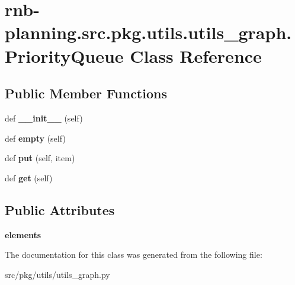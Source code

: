 \hypertarget{classrnb-planning_1_1src_1_1pkg_1_1utils_1_1utils__graph_1_1_priority_queue}{}\section{rnb-\/planning.src.\+pkg.\+utils.\+utils\+\_\+graph.\+Priority\+Queue Class Reference}
\label{classrnb-planning_1_1src_1_1pkg_1_1utils_1_1utils__graph_1_1_priority_queue}
\subsection*{Public Member Functions}
\begin{DoxyCompactItemize}
\item 
\mbox{\label{classrnb-planning_1_1src_1_1pkg_1_1utils_1_1utils__graph_1_1_priority_queue_aa03f98e024fd4d06e5d09839214350e9}} 
def {\bfseries \+\_\+\+\_\+init\+\_\+\+\_\+} (self)
\item 
\mbox{\label{classrnb-planning_1_1src_1_1pkg_1_1utils_1_1utils__graph_1_1_priority_queue_ab4c1afaefe8f1673f1fd6457286e98bf}} 
def {\bfseries empty} (self)
\item 
\mbox{\label{classrnb-planning_1_1src_1_1pkg_1_1utils_1_1utils__graph_1_1_priority_queue_a146c5247d5bb1ec08ae7a374534ffebc}} 
def {\bfseries put} (self, item)
\item 
\mbox{\label{classrnb-planning_1_1src_1_1pkg_1_1utils_1_1utils__graph_1_1_priority_queue_afe3f19b78a6bd46879fdca1bb81dd193}} 
def {\bfseries get} (self)
\end{DoxyCompactItemize}
\subsection*{Public Attributes}
\begin{DoxyCompactItemize}
\item 
\mbox{\label{classrnb-planning_1_1src_1_1pkg_1_1utils_1_1utils__graph_1_1_priority_queue_a36389dfa78e85ae1ff232627e227e972}} 
{\bfseries elements}
\end{DoxyCompactItemize}


The documentation for this class was generated from the following file\+:\begin{DoxyCompactItemize}
\item 
src/pkg/utils/utils\+\_\+graph.\+py\end{DoxyCompactItemize}
